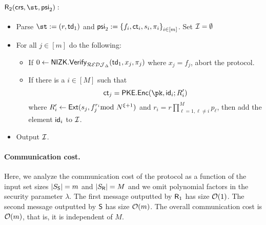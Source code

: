 \begin{construction}
\paragraph{$\Rs_2(\crs,\st,\mathsf{psi}_2):$}
\begin{itemize}
    \item Parse $\st := (r,\td_1)$ and $\mathsf{psi}_2 := \left\{f_i,\mathsf{ct}_i,s_i,\pi_i\right\}_{i\in [m]}$.  Set $\mathcal{I}=\emptyset$
    \item For all $j\in [m]$ do the following: \begin{itemize}
        \item If $0\leftarrow\mathsf{NIZK.Verify}_{\mathcal{REDJ}_{\Delta}}(\mathsf{td}_1,x_j,\pi_j)$ where $x_j=f_j$, abort the protocol.
        \item If there is a $i\in [M]$ such that $$\ct_j=\mathsf{PKE.Enc}(\pk,\id_i;R'_i)$$ where $R_i'\leftarrow\mathsf{Ext}(s_j,f_j^{r_i}\!\!\!\!\mod N^{\xi+1})$ and $r_i={r \displaystyle\prod_{
         \ell=1,
        \ell\neq i
     }^M p_\ell}$, then add the element $\mathsf{id}_i$ to $\mathcal{I}$. 
    \end{itemize} 
 \item Output $\mathcal{I}$.
\end{itemize}
\end{construction}

\paragraph{Communication cost.} Here, we analyze the communication cost of the protocol as a function of the input set sizes $|S_{\mathsf{S}}|=m$ and $|S_{\mathsf{R}}|=M$ and we omit polynomial factors in the security parameter $\lambda$. The first message outputted by $\mathsf{R}_1$ has size $\mathcal{O}(1)$. The second message outputted by $\mathsf{S}$ has size $\mathcal{O}(m)$. The overall communication cost is $\mathcal{O}(m)$, that is, it is independent of $M$.


